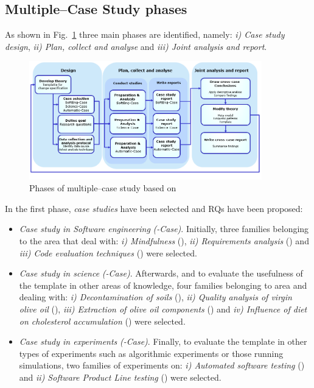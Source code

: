 \subsection{Multiple--Case Study phases}
\label{sec:CS-design}
As shown in Fig.~\ref{fig:Multiple-CaseStudy} three main phases are identified, namely: \emph{i) Case study design}, \emph{ii) Plan, collect and analyse} and \emph{iii) Joint analysis and report}.

\begin{figure}[htbp]
    \centering
    \includegraphics[width=0.9\textwidth] {figures/Multiple-Case}
     \caption{Phases of multiple--case study based on \cite{runeson2012case}}
    \label{fig:Multiple-CaseStudy} 
\end{figure}

In the first phase, \emph{case studies} have been selected and \gls{RQs} have been proposed:


\begin{itemize}   
    \item \emph{Case study in Software engineering} \emph{(\SoftEng-Case)}. Initially, three families belonging to the \SE area that deal with: \emph{i) Mindfulness} (\emph{\Mind}), \emph{ii) Requirements analysis} (\emph{\Req}) and \emph{iii) Code evaluation techniques} (\emph{\Code}) were selected. 
        
    \item \emph{Case study in science} \emph{(\Science-Case)}. Afterwards, and to evaluate the usefulness of the template in other areas of knowledge, four families belonging to \emph{\Science} area and dealing with: \emph{i) Decontamination of soils} (\emph{\Soil}), \emph{ii) Quality analysis of virgin olive oil} (\emph{\Quality}), \emph{iii) Extraction  of  olive oil components} (\emph{\Olive}) and \emph{iv) Influence of diet on cholesterol accumulation} (\emph{\Diet}) were selected.
     
    \item \emph{Case study in \Automatic experiments} \emph{(\Automatic-Case)}. Finally, to evaluate the template in other types of experiments such as algorithmic experiments or those running simulations, two families of experiments on: \emph{i) Automated software testing} (\emph{\Testing}) and \emph{ii) Software Product Line testing} (\emph{\SPL}) were selected.
\end{itemize}
    

